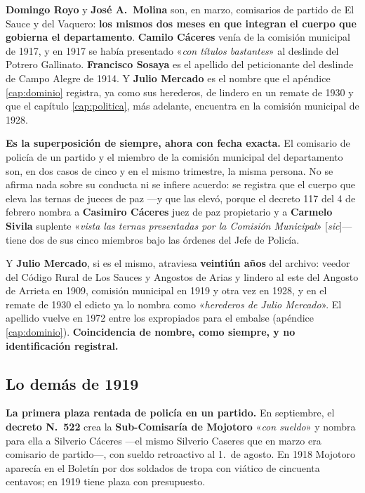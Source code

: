 \textbf{Domingo Royo} y \textbf{José A.\ Molina} son, en marzo, comisarios de partido de El Sauce
y del Vaquero: \textbf{los mismos dos meses en que integran el cuerpo que gobierna el
departamento}. \textbf{Camilo Cáceres} venía de la comisión municipal de 1917, y en 1917 se había
presentado «\textit{con títulos bastantes}» al deslinde del Potrero Gallinato. \textbf{Francisco
Sosaya} es el apellido del peticionante del deslinde de Campo Alegre de 1914. Y \textbf{Julio
Mercado} es el nombre que el apéndice \ref{cap:dominio} registra, ya como sus herederos, de lindero en un remate de
1930 y que el capítulo \ref{cap:politica}, más adelante, encuentra en la comisión municipal de 1928.

\begin{cautela}
\textbf{Es la superposición de siempre, ahora con fecha exacta.} El comisario de policía de un
partido y el miembro de la comisión municipal del departamento son, en dos casos de cinco y en el
mismo trimestre, la misma persona. No se afirma nada sobre su conducta ni se infiere acuerdo: se
registra que el cuerpo que eleva las ternas de jueces de paz ---y que las elevó, porque el decreto
117 del 4 de febrero nombra a \textbf{Casimiro Cáceres} juez de paz propietario y a
\textbf{Carmelo Sivila} suplente «\textit{vista las ternas presentadas por la Comisión Municipal}»
[\textit{sic}]--- tiene dos de sus cinco miembros bajo las órdenes del Jefe de Policía.

Y \textbf{Julio Mercado}, si es el mismo, atraviesa \textbf{veintiún años} del archivo: veedor del
Código Rural de Los Sauces y Angostos de Arias y lindero al este del Angosto de Arrieta en 1909,
comisión municipal en 1919 y otra vez en 1928, y en el remate de 1930 el edicto ya lo nombra como
«\textit{herederos de Julio Mercado}». El apellido vuelve en 1972 entre los expropiados para el
embalse (apéndice \ref{cap:dominio}). \textbf{Coincidencia de nombre, como siempre, y no
identificación registral.}
\end{cautela}

\subsection*{Lo demás de 1919}

\textbf{La primera plaza rentada de policía en un partido.} En septiembre, el \textbf{decreto N.\
522} crea la \textbf{Sub-Comisaría de Mojotoro} «\textit{con sueldo}» y nombra para ella a
Silverio Cáceres ---el mismo Silverio Caseres que en marzo era comisario de partido---, con
sueldo retroactivo al 1.\ de agosto. En 1918 Mojotoro aparecía en el Boletín por dos soldados de
tropa con viático de cincuenta centavos; en 1919 tiene plaza con presupuesto.

